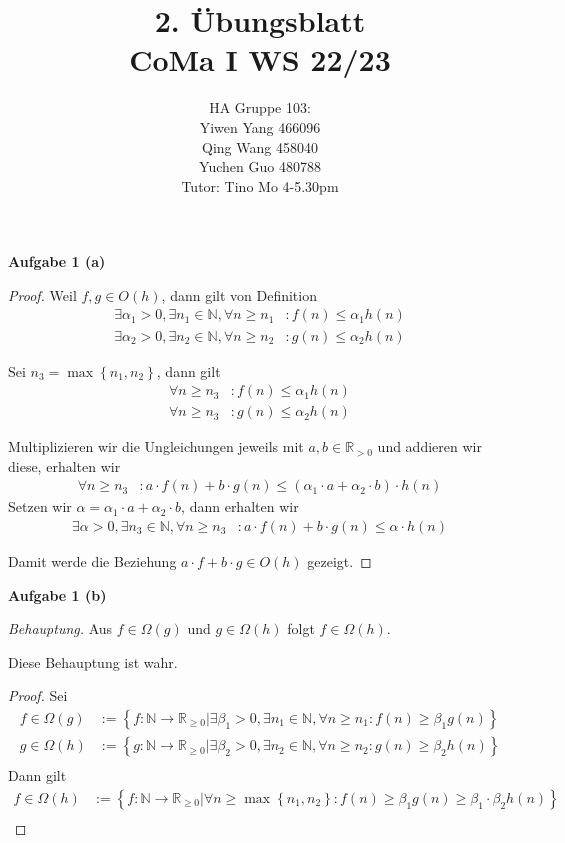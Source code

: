 \documentclass[12pt]{extarticle}
\author{HA Gruppe 103: \\Yiwen Yang 466096\\Qing Wang 458040\\Yuchen Guo 480788\\Tutor: Tino Mo 4-5.30pm}
\title{2. Übungsblatt\\\small CoMa I WS 22/23}
\date{}
\begin{document}
\maketitle
\newpage
\textbf{Aufgabe 1 (a)}
\begin{proof}
Weil \(f, g \in O(h)\), dann gilt von Definition
\begin{align*}
  \exists \alpha_1>0, \exists n_1 \in \mathbb{N}, \forall
  n \geq n_1&: f(n) \leq \alpha_1h(n)\\
  \exists \alpha_2>0, \exists n_2 \in \mathbb{N}, \forall
  n \geq n_2&: g(n) \leq \alpha_2h(n)
\end{align*}

Sei \(n_3=\max \left\{ n_1, n_2 \right\}\), dann gilt
\begin{align*}
  \forall n \geq n_3&: f(n) \leq \alpha_1h(n)\\
  \forall n \geq n_3&: g(n) \leq \alpha_2h(n)
\end{align*}

Multiplizieren wir die Ungleichungen jeweils mit $a, b \in
\mathbb{R}_{>0}$ und addieren wir diese, erhalten wir
\begin{align*}
  \forall n \geq n_3&:
  a\cdot f(n) + b\cdot g(n) \leq (\alpha_1\cdot a +\alpha_2 \cdot b )\cdot h(n)
\end{align*}
Setzen wir \(\alpha=\alpha_1\cdot a +\alpha_2 \cdot b\), dann erhalten
wir
\begin{align*}
  \exists \alpha > 0, \exists n_3 \in \mathbb{N},
  \forall n \geq n_3&:
  a\cdot f(n) + b\cdot g(n) \leq \alpha \cdot h(n)
\end{align*}

Damit werde die Beziehung \(a \cdot f + b \cdot g \in O(h)\) gezeigt.
\end{proof}

\textbf{Aufgabe 1 (b)}

\textit{Behauptung.}  Aus \(f \in \Omega(g)\) und \(g \in \Omega(h)\)
folgt \(f \in \Omega(h)\).

Diese Behauptung ist wahr.
\begin{proof}

  Sei
\begin{align*}
  f \in \Omega(g) &:= \left\{ f: \mathbb{N} \rightarrow \mathbb{R}_{\geq
    0}|\exists \beta_1 >0, \exists n_1 \in \mathbb{N},
  \forall n \geq n_1: f(n) \geq \beta_1 g(n)\right\}\\
  g \in \Omega(h) &:= \left\{ g: \mathbb{N} \rightarrow \mathbb{R}_{\geq
    0}|\exists \beta_2 >0, \exists n_2 \in \mathbb{N},
  \forall n \geq n_2: g(n) \geq \beta_2 h(n)\right\}\\
\end{align*}
Dann gilt
\begin{align*}
  f \in \Omega(h) &:= \left\{
                    f: \mathbb{N} \rightarrow \mathbb{R}_{\geq
                    0}|    \forall n \geq \max \left\{ n_1, n_2 \right\}:
                    f(n) \geq \beta_1 g(n) \geq \beta_1 \cdot
                    \beta_2 h(n)\right\}\\
\end{align*}
\end{proof}
\end{document}
